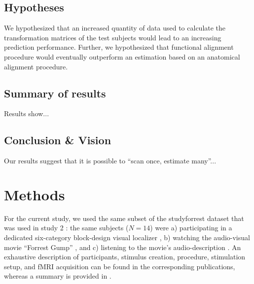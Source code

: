 \subsection{Hypotheses}
%
We hypothesized that an increased quantity of data used to calculate the
transformation matrices of the test subjects would lead to an increasing
prediction performance.
%
Further, we hypothesized that functional alignment procedure would eventually
outperform an estimation based on an anatomical alignment procedure.


\subsection{Summary of results}


%
Results show...


\subsection{Conclusion \& Vision}


Our results suggest that it is possible to ``scan once, estimate many''...



\section{Methods}


For the current study, we used the same subset of the studyforrest dataset that
was used in study 2 \citep{haeusler2022processing}:
%
the same subjects ($N=14$) were
a) participating in a dedicated six-category block-design visual localizer
\citep{sengupta2016extension},
b) watching the audio-visual movie ``Forrest Gump''
\citep{hanke2016simultaneous}, and
c) listening to the movie's audio-description \citep{hanke2014audiomovie}.
An exhaustive description of participants, stimulus creation, procedure,
stimulation setup, and fMRI acquisition can be found in the corresponding
publications, whereas a summary is provided in \citet{haeusler2022processing}.



